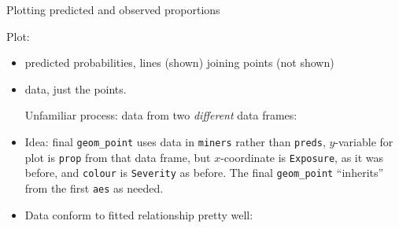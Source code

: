 \begin{frame}[fragile]{Plotting predicted and observed proportions}
  
  Plot:
  \begin{itemize}
  \item predicted probabilities, lines (shown) joining points (not shown)
  \item data, just the points. 
  
  Unfamiliar process: data from two \emph{different} data frames:
  
\begin{knitrout}
\color{fgcolor}\begin{kframe}
\begin{alltt}
\hlkwb{=}\hlstd{(}
    \hlopt{+}
  \hlstd{()}\hlopt{+}
  \hlstd{(}\hlstd{(}
\end{alltt}
\end{kframe}
\end{knitrout}

\item Idea: final \texttt{geom\_point} uses data in \texttt{miners}
  rather than \texttt{preds}, $y$-variable for plot is \texttt{prop}
  from that data frame, but $x$-coordinate is \texttt{Exposure}, as it
  was before, and \texttt{colour} is \texttt{Severity} as before. The
  final \texttt{geom\_point} ``inherits'' from the first \texttt{aes}
  as needed.
\item Data conform to fitted relationship pretty well:
  \end{itemize}
  
\end{frame}

